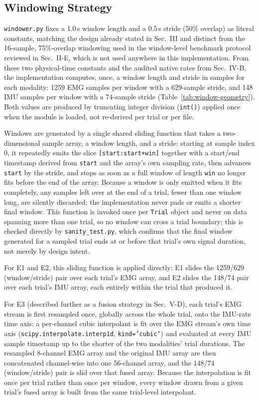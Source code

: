 \documentclass[conference]{IEEEtran}
\begin{document}
\subsection{Windowing Strategy}
\label{subsec:windowing}

\texttt{windower.py} fixes a 1.0\,s window length and a 0.5\,s
stride (50\% overlap) as literal constants, matching the design
already stated in Sec.~III and distinct from the 16-sample,
75\%-overlap windowing used in the window-level benchmark protocol
reviewed in Sec.~II-E, which is not used anywhere in this
implementation. From these two physical-time constants and the
audited native rates from Sec.~IV-B, the implementation computes,
once, a window length and stride in samples for each modality:
1259 EMG samples per window with a 629-sample stride, and 148 IMU
samples per window with a 74-sample stride (Table~\ref{tab:window-geometry}).
Both values are produced by truncating integer division
(\texttt{int()}) applied once when the module is loaded, not
re-derived per trial or per file.

Windows are generated by a single shared sliding function that
takes a two-dimensional sample array, a window length, and a stride:
starting at sample index 0, it repeatedly emits the slice
\texttt{[start:start+win]} together with a start/end timestamp
derived from \texttt{start} and the array's own sampling rate, then
advances \texttt{start} by the stride, and stops as soon as a full
window of length \texttt{win} no longer fits before the end of the
array. Because a window is only emitted when it fits completely,
any samples left over at the end of a trial, fewer than one window
long, are silently discarded; the implementation never pads or
emits a shorter final window. This function is invoked once per
\texttt{Trial} object and never on data spanning more than one
trial, so no window can cross a trial boundary; this is checked
directly by \texttt{sanity\_test.py}, which confirms that the final
window generated for a sampled trial ends at or before that trial's
own signal duration, not merely by design intent.

For E1 and E2, this sliding function is applied directly: E1 slides
the 1259/629 (window/stride) pair over each trial's EMG array, and
E2 slides the 148/74 pair over each trial's IMU array, each entirely
within the trial that produced it.

For E3 (described further as a fusion strategy in Sec.~V-D), each
trial's EMG stream is first resampled once, globally across the
whole trial, onto the IMU-rate time axis: a per-channel cubic
interpolant is fit over the EMG stream's own time axis
(\texttt{scipy.interpolate.interp1d}, \texttt{kind='cubic'}) and
evaluated at every IMU sample timestamp up to the shorter of the two
modalities' trial durations. The resampled 8-channel EMG array and
the original IMU array are then concatenated channel-wise into one
56-channel array, and the 148/74 (window/stride) pair is slid over
that fused array. Because the interpolation is fit once per trial
rather than once per window, every window drawn from a given trial's
fused array is built from the same trial-level interpolant.
\end{document}
